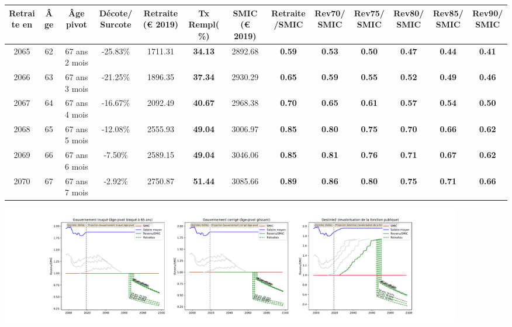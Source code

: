 { \scriptsize \begin{center} 
\begin{tabular}[htb]{|c|c||c|c||c|c||c||c|c|c|c|c|c|} 
\hline 
 Retraite en &  Âge &  Âge pivot &  Décote/Surcote &  Retraite (\euro{} 2019) &  Tx Rempl(\%) &  SMIC (\euro{} 2019) &  Retraite/SMIC &  Rev70/SMIC &  Rev75/SMIC &  Rev80/SMIC &  Rev85/SMIC &  Rev90/SMIC \\ 
\hline \hline 
 2065 &  62 &  67 ans 2 mois &  -25.83\% &  1711.31 &  {\bf 34.13} &  2892.68 &  {\bf {\color{red} 0.59}} &  {\bf {\color{red} 0.53}} &  {\bf {\color{red} 0.50}} &  {\bf {\color{red} 0.47}} &  {\bf {\color{red} 0.44}} &  {\bf {\color{red} 0.41}} \\ 
\hline 
 2066 &  63 &  67 ans 3 mois &  -21.25\% &  1896.35 &  {\bf 37.34} &  2930.29 &  {\bf {\color{red} 0.65}} &  {\bf {\color{red} 0.59}} &  {\bf {\color{red} 0.55}} &  {\bf {\color{red} 0.52}} &  {\bf {\color{red} 0.49}} &  {\bf {\color{red} 0.46}} \\ 
\hline 
 2067 &  64 &  67 ans 4 mois &  -16.67\% &  2092.49 &  {\bf 40.67} &  2968.38 &  {\bf {\color{red} 0.70}} &  {\bf {\color{red} 0.65}} &  {\bf {\color{red} 0.61}} &  {\bf {\color{red} 0.57}} &  {\bf {\color{red} 0.54}} &  {\bf {\color{red} 0.50}} \\ 
\hline 
 2068 &  65 &  67 ans 5 mois &  -12.08\% &  2555.93 &  {\bf 49.04} &  3006.97 &  {\bf {\color{red} 0.85}} &  {\bf {\color{red} 0.80}} &  {\bf {\color{red} 0.75}} &  {\bf {\color{red} 0.70}} &  {\bf {\color{red} 0.66}} &  {\bf {\color{red} 0.62}} \\ 
\hline 
 2069 &  66 &  67 ans 6 mois &  -7.50\% &  2589.15 &  {\bf 49.04} &  3046.06 &  {\bf {\color{red} 0.85}} &  {\bf {\color{red} 0.81}} &  {\bf {\color{red} 0.76}} &  {\bf {\color{red} 0.71}} &  {\bf {\color{red} 0.67}} &  {\bf {\color{red} 0.62}} \\ 
\hline 
 2070 &  67 &  67 ans 7 mois &  -2.92\% &  2750.87 &  {\bf 51.44} &  3085.66 &  {\bf {\color{red} 0.89}} &  {\bf {\color{red} 0.86}} &  {\bf {\color{red} 0.80}} &  {\bf {\color{red} 0.75}} &  {\bf {\color{red} 0.71}} &  {\bf {\color{red} 0.66}} \\ 
\hline 
\hline 
\end{tabular} 
\end{center} } 

 \begin{center}\includegraphics[width=0.9\textwidth]{fig/BIATSS_2003_22_dest_retraite.pdf}\end{center} \label{fig/BIATSS_2003_22_dest_retraite.pdf} 

